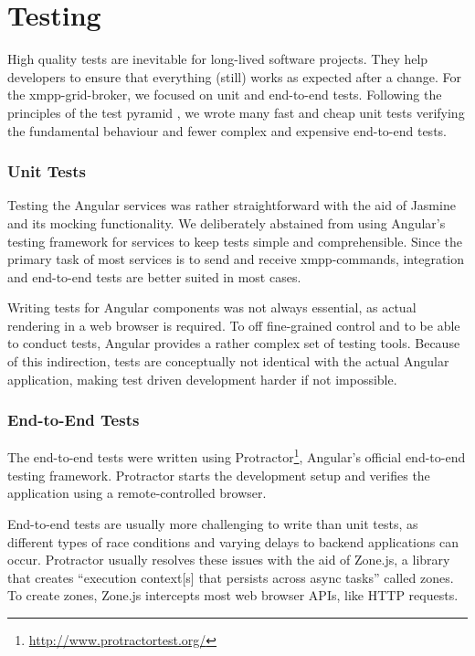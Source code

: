 \section{Testing}\label{sec:testing}

High quality tests are inevitable for long-lived software projects.
They help developers to ensure that everything (still) works as expected after a change.
For the \gls{xmpp-grid-broker}, we focused on unit and end-to-end tests.
Following the principles of the test pyramid \cite{Cohn:2009:SAS:1667109}, we wrote many fast and cheap unit tests verifying the fundamental behaviour and fewer complex and expensive end-to-end tests.

\subsubsection{Unit Tests}

Testing the Angular services was rather straightforward with the aid of Jasmine and its mocking functionality.
We deliberately abstained from using Angular's testing framework for services to keep tests simple and comprehensible.
Since the primary task of most services is to send and receive \gls{xmpp}-commands, integration and end-to-end tests are better suited in most cases.

Writing tests for Angular components was not always essential, as actual rendering in a web browser is required.
To off fine-grained control and to be able to conduct tests, Angular provides a rather complex set of testing tools.
Because of this indirection, tests are conceptually not identical with the actual Angular application, making test driven development harder if not impossible.

\subsubsection{End-to-End Tests}

The end-to-end tests were written using Protractor\footnote{\url{http://www.protractortest.org/}}, Angular's official end-to-end testing framework.
Protractor starts the development setup and verifies the application using a remote-controlled browser.

End-to-end tests are usually more challenging to write than unit tests, as different types of race conditions and varying delays to backend applications can occur.
Protractor usually resolves these issues with the aid of Zone.js, a library that creates ``execution context[s] that persists across async tasks'' called zones.
To create zones, Zone.js intercepts most web browser APIs, like HTTP requests.~\cite{zone-js-readme}

